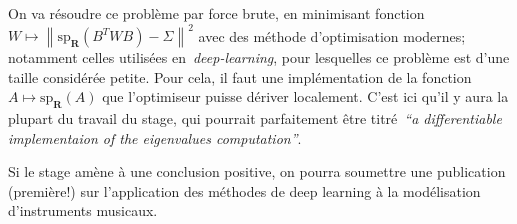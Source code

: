 \documentclass[a4paper,11pt]{article}
\begin{document}
On va résoudre ce problème par force brute, en minimisant
fonction~$W\mapsto\left\|\mathrm{sp}_\mathbf{R}\left(B^TWB\right)-\Sigma\right\|^2$
avec des méthode d'optimisation modernes; notamment celles utilisées
en~\emph{deep-learning}, pour lesquelles ce problème est d'une taille
considérée petite.  Pour cela, il faut une implémentation de la
fonction~$A\mapsto\mathrm{sp}_\mathbf R(A)$ que l'optimiseur puisse dériver
localement.  C'est ici qu'il y aura la plupart du travail du stage, qui
pourrait parfaitement être titré~\emph{``a differentiable implementaion of the
eigenvalues computation''}.

Si le stage amène à une conclusion positive, on pourra soumettre une
publication (première!) sur l'application des méthodes de deep learning à la
modélisation d'instruments musicaux.


%
\end{document}
